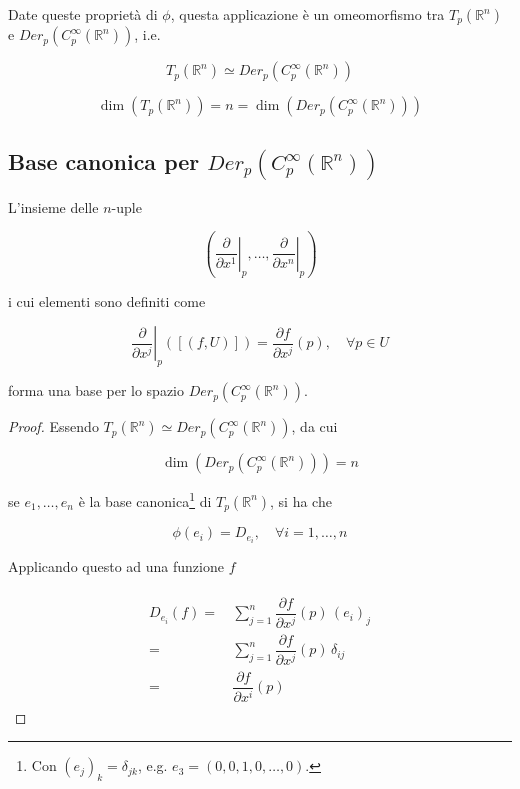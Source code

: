 Date queste proprietà di $ \phi $, questa applicazione è un omeomorfismo tra $ T_{p}(\mathbb{R}^{n}) $ e $ Der_{p}(C_{p}^{\infty}(\mathbb{R}^{n})) $, i.e.

\begin{equation}
	T_{p}(\mathbb{R}^{n}) \simeq Der_{p}(C_{p}^{\infty}(\mathbb{R}^{n}))
\end{equation}

\begin{corollary}
	\begin{equation}
		\dim ( T_{p}(\mathbb{R}^{n}) ) = n = \dim ( Der_{p}(C_{p}^{\infty}(\mathbb{R}^{n})) )
	\end{equation}
\end{corollary}

\subsection{Base canonica per $ Der_{p}(C_{p}^{\infty}(\mathbb{R}^{n})) $}

L'insieme delle $ n $-uple

\begin{equation}
	\left( \left. \dfrac{\partial}{\partial x^{1}} \right|_{p},\dots,\left. \dfrac{\partial}{\partial x^{n}} \right|_{p} \right)
\end{equation}

i cui elementi sono definiti come

\begin{equation}
	\left. \dfrac{\partial}{\partial x^{j}} \right|_{p} ([(f,U)]) = \dfrac{\partial f}{\partial x^{j}} (p), \quad \forall p \in U
\end{equation}

forma una base per lo spazio $ Der_{p}(C_{p}^{\infty}(\mathbb{R}^{n})) $.

\begin{proof}
	Essendo $ T_{p}(\mathbb{R}^{n}) \simeq Der_{p}(C_{p}^{\infty}(\mathbb{R}^{n})) $, da cui
	
	\begin{equation}
		\dim ( Der_{p}(C_{p}^{\infty}(\mathbb{R}^{n})) ) = n
	\end{equation}
		
	se $ e_{1},\dots,e_{n} $ è la base canonica\footnote{%
		Con $ (e_{j})_{k} = \delta_{jk} $, e.g. $ e_{3} = (0,0,1,0,\dots,0) $.%
	} di $ T_{p}(\mathbb{R}^{n}) $, si ha che

	\begin{equation}
		\phi(e_{i}) = D_{e_{i}}, \quad \forall i=1,\dots,n
	\end{equation}

	Applicando questo ad una funzione $ f $
	
	\begin{align}
		\begin{split}
			D_{e_{i}} (f) =& \, \sum_{j=1}^{n} \dfrac{\partial f}{\partial x^{j}} (p) \, (e_{i})_{j}\\
			=& \, \sum_{j=1}^{n} \dfrac{\partial f}{\partial x^{j}} (p) \, \delta_{ij}\\
			=& \, \dfrac{\partial f}{\partial x^{i}} (p)
		\end{split}
	\end{align}
\end{proof}

